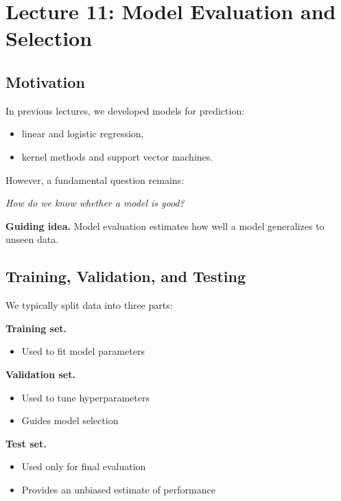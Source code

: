 \section{Lecture 11: Model Evaluation and Selection}

\subsection{Motivation}

In previous lectures, we developed models for prediction:
\begin{itemize}
    \item linear and logistic regression,
    \item kernel methods and support vector machines.
\end{itemize}

\medskip

\noindent
However, a fundamental question remains:

\medskip

\noindent
\textit{How do we know whether a model is good?}

\medskip

\noindent
\textbf{Guiding idea.}  
Model evaluation estimates how well a model generalizes to unseen data.

\subsection{Training, Validation, and Testing}

We typically split data into three parts:

\medskip

\noindent
\textbf{Training set.}
\begin{itemize}
    \item Used to fit model parameters
\end{itemize}

\medskip

\noindent
\textbf{Validation set.}
\begin{itemize}
    \item Used to tune hyperparameters
    \item Guides model selection
\end{itemize}

\medskip

\noindent
\textbf{Test set.}
\begin{itemize}
    \item Used only for final evaluation
    \item Provides an unbiased estimate of performance
\end{itemize}

